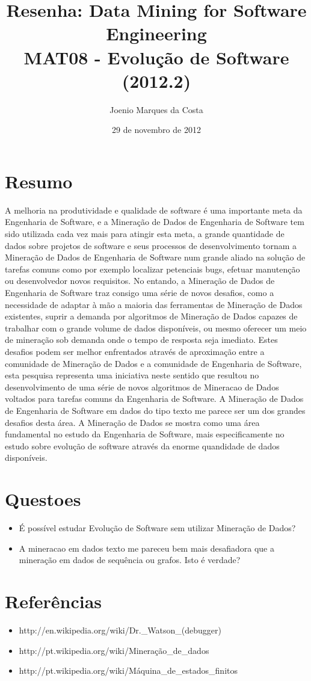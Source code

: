 \documentclass[12pt]{article}
\title{Resenha: Data Mining for Software Engineering \\
 \large MAT08 - Evolução de Software (2012.2)}
\author{Joenio Marques da Costa}
\date{29 de novembro de 2012}
\begin{document}
\maketitle

\section{Resumo}

A melhoria na produtividade e qualidade de software é uma importante meta da
Engenharia de Software, e a Mineração de Dados de Engenharia de Software tem
sido utilizada cada vez mais para atingir esta meta, a grande quantidade de
dados sobre projetos de software e seus processos de desenvolvimento tornam a
Mineração de Dados de Engenharia de Software num grande aliado na solução de
tarefas comuns como por exemplo localizar petenciais bugs, efetuar manutenção
ou desenvolvedor novos requisitos. No entando, a Mineração de Dados de
Engenharia de Software traz consigo uma série de novos desafios, como a
necessidade de adaptar à mão a maioria das ferramentas de Mineração de Dados
existentes, suprir a demanda por algoritmos de Mineração de Dados capazes de
trabalhar com o grande volume de dados disponíveis, ou mesmo oferecer um meio
de mineração sob demanda onde o tempo de resposta seja imediato. Estes desafios
podem ser melhor enfrentados através de aproximação entre a comunidade de
Mineração de Dados e a comunidade de Engenharia de Software, esta pesquisa
representa uma iniciativa neste sentido que resultou no desenvolvimento de uma
série de novos algoritmos de Mineracao de Dados voltados para tarefas comuns da
Engenharia de Software. A Mineração de Dados de Engenharia de Software em dados
do tipo texto me parece ser um dos grandes desafios desta área. A Mineração de
Dados se mostra como uma área fundamental no estudo da Engenharia de Software,
mais especificamente no estudo sobre evolução de software através da enorme
quandidade de dados disponíveis.

\section{Questoes}

\begin{itemize}
  \item É possível estudar Evolução de Software sem utilizar Mineração de
     Dados?
  \item A mineracao em dados texto me pareceu bem mais desafiadora que a
     mineração em dados de sequência ou grafos.  Isto é verdade?
\end{itemize}

\section{Referências}

\begin{itemize}
  \item http://en.wikipedia.org/wiki/Dr.\_Watson\_(debugger)
  \item http://pt.wikipedia.org/wiki/Mineração\_de\_dados
  \item http://pt.wikipedia.org/wiki/Máquina\_de\_estados\_finitos
\end{itemize}
\end{document}
